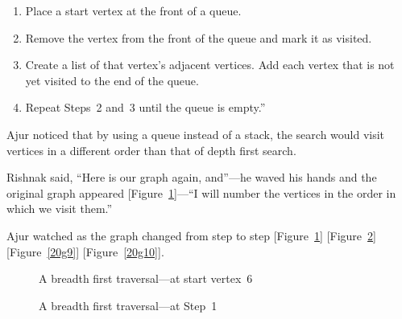 \begin{enumerate}
    \item Place a start vertex at the front of a queue.
    \item Remove the vertex from the front of the queue and mark it as visited.
    \item Create a list of that vertex's adjacent vertices. Add each vertex that is not yet visited to the end of the queue.
    \item Repeat Steps~2 and~3 until the queue is empty.''
\end{enumerate}

Ajur noticed that by using a queue instead of a stack, the search would visit vertices in a different order than that of depth first search.

Rishnak said, ``Here is our graph again, and''---he waved his hands and the original graph appeared [Figure~\ref{20g7}]---``I will number the vertices in the order in which we visit them.''

Ajur watched as the graph changed from step to step [Figure~\ref{20g7}] [Figure~\ref{20g8}] [Figure~\ref{20g9}] [Figure~\ref{20g10}].

\begin{figure}
\begin{center}
\caption{A breadth first traversal---at start vertex~6}\label{20g7}
\end{center}
\end{figure}


\begin{figure}
\begin{center}
\caption{A breadth first traversal---at Step~1}\label{20g8}
\end{center}
\end{figure}


